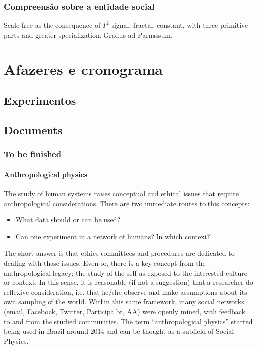 \documentclass[a4paper,openright,12pt]{report} %
\begin{document}
\subsection{Compreensão sobre a entidade social}
Scale free as the consequence of $T^2$ signal, fractal, constant, with three primitive parts and greater specialization. Gradus ad Parnassum.

\chapter{Afazeres e cronograma}
\section{Experimentos}\label{sec:exp}
\section{Documents}
\subsection{To be finished}
\subsubsection{Anthropological physics}
The study of human systems raises conceptual
and ethical issues that require anthropological considerations.
There are two immediate routes to this concepts:
\begin{itemize}
	\item What data should or can be used?
	\item Can one experiment in a network of humans? In which context?
\end{itemize}

The short answer is that ethics committees and procedures are dedicated to dealing with those issues.
Even so, there is a key-concept from the anthropological legacy: the study of the self as exposed to the interested culture or context. 
In this sense, it is reasonable (if not a suggestion) that
a researcher do reflexive consideration, 
i.e. that he/she observe and make assumptions about its own sampling of the world.
Within this same framework, many social networks (email, Facebook, Twitter, Participa.br, AA) were openly mined,
with feedback to and from the studied communities.
The term ``anthropological physics'' started being used in Brazil around
2014 and can be thought as a subfield of Social Physics.
\end{document}

